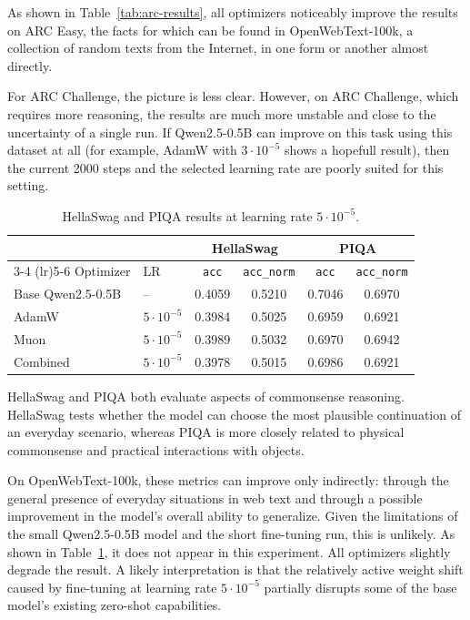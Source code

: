 \documentclass{article}
\begin{document}
As shown in Table~\ref{tab:arc-results}, all optimizers noticeably improve the
results on ARC Easy, the facts for which can be found in OpenWebText-100k, a 
collection of random texts from the Internet, in one form or another almost 
directly.

For ARC Challenge, the picture is less clear. However, on ARC Challenge, 
which requires more reasoning, the results are much more unstable and close to the 
uncertainty of a single run. If Qwen2.5-0.5B can improve on this task using this 
dataset at all (for example, AdamW with $3 \cdot 10^{-5}$ shows a hopefull result),
then the current 2000 steps and the selected learning rate are poorly suited
for this setting.

\begin{table}[ht]
\centering
\begin{tabular}{llcccc}
\toprule
& & \multicolumn{2}{c}{HellaSwag} & \multicolumn{2}{c}{PIQA} \\
\cmidrule(lr){3-4} \cmidrule(lr){5-6}
Optimizer & LR
& \texttt{acc} & \texttt{acc\_norm}
& \texttt{acc} & \texttt{acc\_norm} \\
\midrule
Base Qwen2.5-0.5B & -- & 0.4059 & 0.5210 & 0.7046 & 0.6970 \\
\midrule
AdamW    & $5 \cdot 10^{-5}$ & 0.3984 & 0.5025 & 0.6959 & 0.6921 \\
Muon     & $5 \cdot 10^{-5}$ & 0.3989 & 0.5032 & 0.6970 & 0.6942 \\
Combined & $5 \cdot 10^{-5}$ & 0.3978 & 0.5015 & 0.6986 & 0.6921 \\
\bottomrule
\end{tabular}
\caption{HellaSwag and PIQA results at learning rate $5 \cdot 10^{-5}$.}
\label{tab:hellaswag-piqa-results}
\end{table}

HellaSwag and PIQA both evaluate aspects of commonsense reasoning. HellaSwag
tests whether the model can choose the most plausible continuation of an
everyday scenario, whereas PIQA is more closely related to physical commonsense
and practical interactions with objects.

On OpenWebText-100k, these metrics can improve only indirectly: through the
general presence of everyday situations in web text and through a possible
improvement in the model's overall ability to generalize. Given the limitations
of the small Qwen2.5-0.5B model and the short fine-tuning run, this is unlikely. 
As shown in Table~\ref{tab:hellaswag-piqa-results}, it does not appear in this 
experiment. All optimizers slightly degrade the result. A likely interpretation 
is that the relatively active weight shift caused by fine-tuning at learning rate 
$5 \cdot 10^{-5}$ partially disrupts some of the base model's existing zero-shot 
capabilities.
\end{document}

